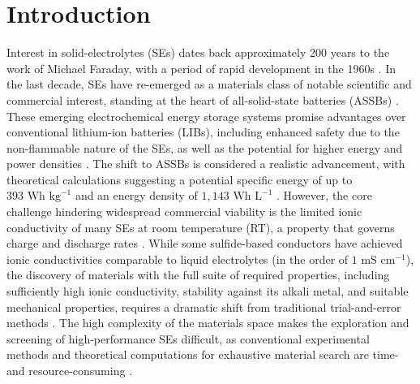 \documentclass[a4paper,fleqn]{cas-sc}
\begin{document}



\maketitle

\section{Introduction}
Interest in solid-electrolytes (SEs) dates back approximately 200 years to the work of Michael Faraday, with a period of rapid development in the 1960s \cite{zhao2020designing}. In the last decade, SEs have re-emerged as a materials class of notable scientific and commercial interest, standing at the heart of all-solid-state batteries (ASSBs) \cite{famprikis2019fundamentals}. These emerging electrochemical energy storage systems promise advantages over conventional lithium-ion batteries (LIBs), including enhanced safety due to the non-flammable nature of the SEs, as well as the potential for higher energy and power densities \cite{zhao2020designing, janek2023challenges}. The shift to ASSBs is considered a realistic advancement, with theoretical calculations suggesting a potential specific energy of up to $393 \text{ Wh } \text{kg}^{-1}$ and an energy density of $1,143 \text{ Wh } \text{L}^{-1}$ \cite{janek2023challenges}. However, the core challenge hindering widespread commercial viability is the limited ionic conductivity of many SEs at room temperature (RT), a property that governs charge and discharge rates \cite{zhao2020designing, therrien2025obelix}. While some sulfide-based conductors have achieved ionic conductivities comparable to liquid electrolytes (in the order of $1 \text{ mS } \text{cm}^{-1}$), the discovery of materials with the full suite of required properties, including sufficiently high ionic conductivity, stability against its alkali metal, and suitable mechanical properties, requires a dramatic shift from traditional trial-and-error methods \cite{therrien2025obelix, zhao2020designing, yu2025data}. The high complexity of the materials space makes the exploration and screening of high-performance SEs difficult, as conventional experimental methods and theoretical computations for exhaustive material search are time- and resource-consuming \cite{yang2024dynamic, mishra2023exploring}.
\end{document}
